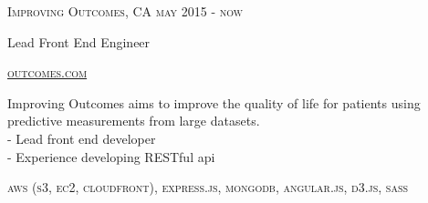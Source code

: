 {
    \textsc{\small{Improving Outcomes, CA
        \hfill
            {\raggedleft
                may 2015 - now
            } \\
        }
    }
    {\raggedright\large {
        Lead Front End Engineer
    } \\}

    \textsc{\small\href{http://www.outcomes.com}{outcomes.com}}

    \normalsize{\raggedright
        Improving Outcomes aims to improve the quality of life for patients using predictive measurements from large datasets. \\
        - Lead front end developer \\
        - Experience developing RESTful api
    }

    \textsc{\small{\color{highlight}
        aws (s3, ec2, cloudfront),
        express.js,
        mongodb,
        angular.js,
        d3.js,
        sass
    }}
}
